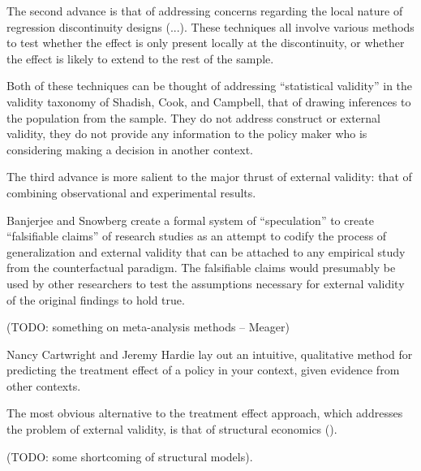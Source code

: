 \documentclass[a4paper,12pt]{article}
\begin{document}
The second advance is that of addressing concerns regarding the local nature of regression discontinuity designs (...). These techniques all involve various methods to test whether the effect is only present locally at the discontinuity, or whether the effect is likely to extend to the rest of the sample.

Both of these techniques can be thought of addressing ``statistical validity'' in the validity taxonomy of Shadish, Cook, and Campbell, that of drawing inferences to the population from the sample. They do not address construct or external validity, they do not provide any information to the policy maker who is considering making a decision in another context.

The third advance is more salient to the major thrust of external validity: that of combining observational and experimental results.








Banjerjee and Snowberg \parencite*{Snowberg2016} create a formal system of ``speculation'' to create ``falsifiable claims'' of research studies as an attempt to codify the process of generalization and external validity that can be attached to any empirical study from the counterfactual paradigm. The falsifiable claims would presumably be used by other researchers to test the assumptions necessary for external validity of the original findings to hold true.

(TODO: something on meta-analysis methods -- Meager)

Nancy Cartwright and Jeremy Hardie \parencite*{Catwright2013} lay out an intuitive, qualitative method for predicting the treatment effect of a policy in your context, given evidence from other contexts. 


The most obvious alternative to the treatment effect approach, which addresses the problem of external validity, is that of structural economics (\cite{Heckman2008}).

(TODO: some shortcoming of structural models).
\end{document}
